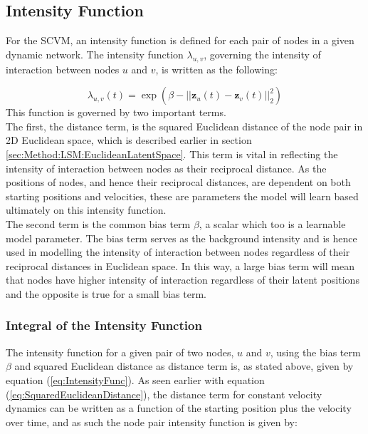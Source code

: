 \subsection{Intensity Function}
\label{sec:Method:IntensityFunc}
For the SCVM, an intensity function is defined for each pair of nodes in a given dynamic network.
The intensity function $\lambda_{u,v}$, governing the intensity of interaction between nodes $u$ and $v$, is written as the following:

\begin{equation}
    \lambda_{u,v}(t)
    =
    \exp \left(\beta - ||\textbf{z}_u(t) - \textbf{z}_v(t)||_2^2\right)
    \label{eq:IntensityFunc}
\end{equation}
This function is governed by two important terms.
\\
The first, the distance term, is the squared Euclidean distance of the node pair in 2D Euclidean space, which is described earlier in section \ref{sec:Method:LSM:EuclideanLatentSpace}.
This term is vital in reflecting the intensity of interaction between nodes as their reciprocal distance.
As the positions of nodes, and hence their reciprocal distances, are dependent on both starting positions and velocities, these are parameters the model will learn based ultimately on this intensity function.
\\
The second term is the common bias term $\beta$, a scalar which too is a learnable model parameter. 
The bias term serves as the background intensity and is hence used in modelling the intensity of interaction between nodes regardless of their reciprocal distances in Euclidean space. 
In this way, a large bias term will mean that nodes have higher intensity of interaction regardless of their latent positions and the opposite is true for a small bias term.


\subsubsection{Integral of the Intensity Function}
\label{sec:Method:IntensityFunc:IntegralIntensityFunc}
The intensity function for a given pair of two nodes, $u$ and $v$, using the bias term $\beta$ and squared Euclidean distance as distance term is, as stated above, given by equation (\ref{eq:IntensityFunc}).
As seen earlier with equation (\ref{eq:SquaredEuclideanDistance}), the distance term for constant velocity dynamics can be written as a function of the starting position plus the velocity over time, and as such the node pair intensity function is given by:


